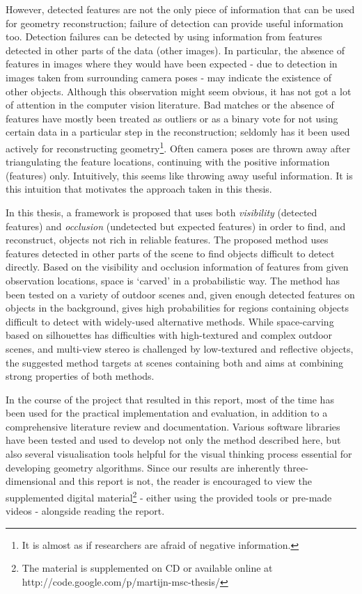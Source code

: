 However, detected features are not the only piece of information that can be used for geometry reconstruction; failure of detection can provide useful information too. Detection failures can be detected by using information from features detected in other parts of the data (\eg other images). In particular, the absence of features in images where they would have been expected - due to detection in images taken from surrounding camera poses - may indicate the existence of other objects. Although this observation might seem obvious, it has not got a lot of attention in the computer vision literature. Bad matches or the absence of features have mostly been treated as outliers or as a binary vote for not using certain data in a particular step in the reconstruction; seldomly has it been used actively for reconstructing geometry\footnote{It is almost as if researchers are afraid of negative information.}. Often camera poses are thrown away after triangulating the feature locations, continuing with the positive information (features) only. Intuitively, this seems like throwing away useful information. It is this intuition that motivates the approach taken in this thesis.

In this thesis, a framework is proposed that uses both \emph{visibility} (detected features) and \emph{occlusion} (undetected but expected features) in order to find, and reconstruct, objects not rich in reliable features. The proposed method uses features detected in other parts of the scene to find objects difficult to detect directly. Based on the visibility and occlusion information of features from given observation locations, space is `carved' in a probabilistic way. The method has been tested on a variety of outdoor scenes and, given enough detected features on objects in the background, gives high probabilities for regions containing objects difficult to detect with widely-used alternative methods. While space-carving based on silhouettes has difficulties with high-textured and complex outdoor scenes, and multi-view stereo is challenged by low-textured and reflective objects, the suggested method targets at scenes containing both and aims at combining strong properties of both methods.

In the course of the project that resulted in this report, most of the time has been used for the practical implementation and evaluation, in addition to a comprehensive literature review and documentation. Various software libraries have been tested and used to develop not only the method described here, but also several visualisation tools helpful for the visual thinking process essential for developing geometry algorithms. Since our results are inherently three-dimensional and this report is not, the reader is encouraged to view the supplemented digital material\footnote{The material is supplemented on CD or available online at http://code.google.com/p/martijn-msc-thesis/} - either using the provided tools or pre-made videos - alongside reading the report.

